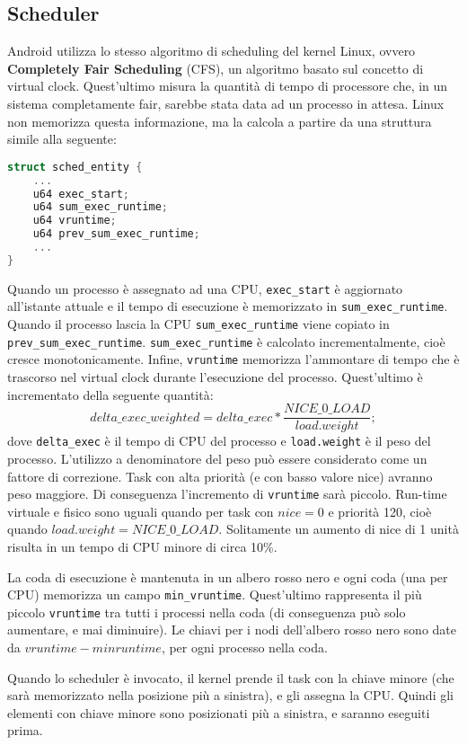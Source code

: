 \subsection{Scheduler}
Android utilizza lo stesso algoritmo di scheduling del kernel Linux, ovvero \textbf{Completely Fair Scheduling} (CFS), un algoritmo basato sul concetto di virtual clock. Quest'ultimo misura la quantità di tempo di processore che, in un sistema completamente fair, sarebbe stata data ad un processo in attesa. Linux non memorizza questa informazione, ma la calcola a partire da una struttura simile alla seguente:
\begin{lstlisting}[language=c, caption={Entità schedulabile in Linux}, label={lst:schedentity}]
struct sched_entity {
	...
	u64 exec_start;
	u64 sum_exec_runtime;
	u64 vruntime;
	u64 prev_sum_exec_runtime;
	...
}
\end{lstlisting}
Quando un processo è assegnato ad una CPU, \texttt{exec\_start} è aggiornato all'istante attuale e il tempo di esecuzione è memorizzato in \texttt{sum\_exec\_runtime}. Quando il processo lascia la CPU \texttt{sum\_exec\_runtime} viene copiato in \\\texttt{prev\_sum\_exec\_runtime}. \texttt{sum\_exec\_runtime} è calcolato incrementalmente, cioè cresce monotonicamente. Infine, \texttt{vruntime} memorizza l'ammontare di tempo che è trascorso nel virtual clock durante l'esecuzione del processo. Quest'ultimo è incrementato della seguente quantità:
\[ delta\_exec\_weighted = delta\_exec * \frac{NICE\_0\_LOAD}{load.weight}; \]
dove \texttt{delta\_exec} è il tempo di CPU del processo e \texttt{load.weight} è il peso del processo. L'utilizzo a denominatore del peso può essere considerato come un fattore di correzione. Task con alta priorità (e con basso valore nice) avranno peso maggiore. Di conseguenza l'incremento di \texttt{vruntime} sarà piccolo. Run-time virtuale e fisico sono uguali quando per task con $nice = 0$ e priorità 120, cioè quando $load.weight = NICE\_0\_LOAD$. Solitamente un aumento di nice di 1 unità risulta in un tempo di CPU minore di circa 10\%. 

La coda di esecuzione è mantenuta in un albero rosso nero e ogni coda (una per CPU) memorizza un campo \texttt{min\_vruntime}. Quest'ultimo rappresenta il più piccolo \texttt{vruntime} tra tutti i processi nella coda (di conseguenza può solo aumentare, e mai diminuire). Le chiavi per i nodi dell'albero rosso nero sono date da $vruntime - minruntime$, per ogni processo nella coda.

Quando lo scheduler è invocato, il kernel prende il task con la chiave minore (che sarà memorizzato nella posizione più a sinistra), e gli assegna la CPU. Quindi gli elementi con chiave minore sono posizionati più a sinistra, e saranno eseguiti prima.

